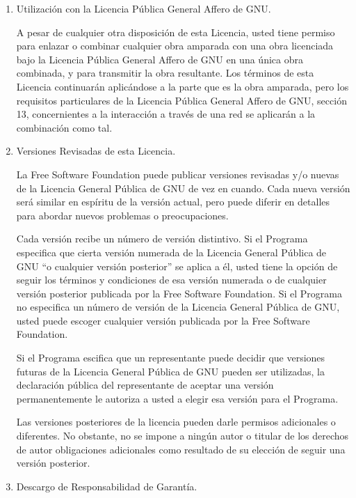\documentclass[11pt]{article}
\begin{document}
\begin{enumerate}
\item Utilizaci\'{o}n con la Licencia P\'{u}blica General Affero de GNU.

A pesar de cualquier otra disposici\'{o}n de esta Licencia, usted tiene
permiso para enlazar o combinar cualquier obra amparada con una obra 
licenciada bajo la Licencia P\'{u}blica General Affero de GNU en una \'{u}nica obra 
combinada, y para transmitir la obra resultante. Los t\'{e}rminos de esta 
Licencia continuar\'{a}n aplic\'{a}ndose a la parte que es la obra amparada, pero 
los requisitos particulares de la Licencia P\'{u}blica General Affero de GNU, 
secci\'{o}n 13, concernientes a la interacci\'{o}n a trav\'{e}s de una red se aplicar\'{a}n 
a la combinaci\'{o}n como tal.

\item Versiones Revisadas de esta Licencia.

La Free Software Foundation puede publicar versiones revisadas y/o nuevas 
de la Licencia General P\'{u}blica de GNU de vez en cuando. Cada nueva versi\'{o}n 
ser\'{a} similar en esp\'{i}ritu de la versi\'{o}n actual, pero puede diferir en 
detalles para abordar nuevos problemas o preocupaciones.

Cada versi\'{o}n recibe un n\'{u}mero de versi\'{o}n distintivo. Si el Programa 
especifica que cierta versi\'{o}n numerada de la Licencia General P\'{u}blica de 
GNU ``o cualquier versi\'{o}n posterior'' se aplica a \'{e}l, usted tiene la opci\'{o}n 
de seguir los t\'{e}rminos y condiciones de esa versi\'{o}n numerada o de cualquier 
versi\'{o}n posterior publicada por la Free Software Foundation. Si el Programa 
no especifica un n\'{u}mero de versi\'{o}n de la Licencia General P\'{u}blica de GNU, 
usted puede escoger cualquier versi\'{o}n publicada por la Free Software 
Foundation.

Si el Programa escifica que un representante puede decidir que versiones 
futuras de la Licencia General P\'{u}blica de GNU pueden ser utilizadas, la 
declaraci\'{o}n p\'{u}blica del representante de aceptar una versi\'{o}n permanentemente 
le autoriza a usted a elegir esa versi\'{o}n para el Programa.

Las versiones posteriores de la licencia pueden darle permisos adicionales 
o diferentes. No obstante, no se impone a ning\'{u}n autor o titular de los 
derechos de autor obligaciones adicionales como resultado de su elecci\'{o}n de 
seguir una versi\'{o}n posterior.

\item Descargo de Responsabilidad de Garant\'{i}a.


\end{enumerate}
\end{document}
